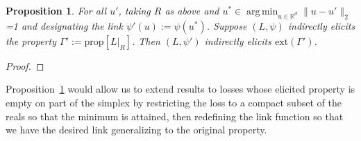 \documentclass{article}
\newcommand{\Comments}{1}
\newcommand{\mytodo}[2]{\ifnum\Comments=1%
	\todo[linecolor=#1!80!black,backgroundcolor=#1,bordercolor=#1!80!black]{#2}\fi}
\newcommand{\jessiet}[1]{\mytodo{purple!20!white}{JF: #1}}
\newcommand{\reals}{\mathbb{R}}
\newcommand{\prop}[1]{\mathrm{prop}[#1]}
\newcommand{\ext}{\mathrm{ext}}
\newtheorem{proposition}{Proposition}
\DeclareMathOperator*{\argmin}{arg\,min}
\begin{document}
\begin{proposition}\label{prop:extend-to-reals-d}
	For all $u'$, taking $R$ as above and $u^* \in \argmin_{u \in \reals^d} \|u - u'\|_2$ \jessiet{Check?} and designating the link $\psi'(u) := \psi(u^*)$.
	Suppose $(L, \psi)$ indirectly elicits the property $\Gamma' := \prop{L|_R}$.
	Then $(L,\psi')$ indirectly elicits $\ext(\Gamma')$.
\end{proposition}
\begin{proof}

\end{proof}

Proposition~\ref{prop:extend-to-reals-d} would allow us to extend results to losses whose elicited property is empty on part of the simplex by restricting the loss to a compact subset of the reals so that the minimum is attained, then redefining the link function so that we have the desired link generalizing to the original property.

\newpage
\end{document}
